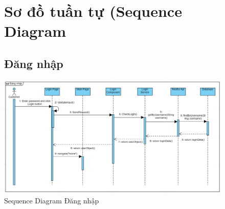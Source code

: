 \documentclass{report}
\begin{document}
\pagebreak

\begin{center}
    \begin{figure}[htp]
        \section{Sơ đồ tuần tự (Sequence Diagram}
        \subsection{Đăng nhập}
        \begin{center}
            \includegraphics[scale = 0.5]{image/sequence_dangnhap.png}
        \end{center}
        \caption{Sequence Diagram Đăng nhập}
    \end{figure}
\end{center}
\end{document}
